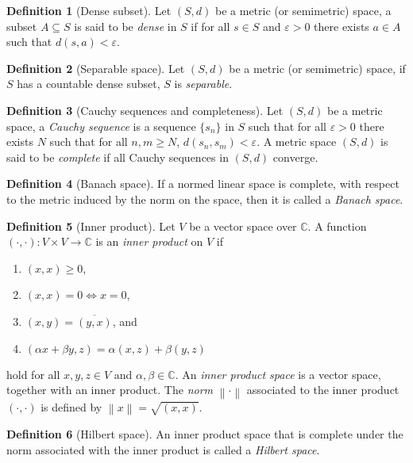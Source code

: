 \documentclass[12pt]{article}
\theoremstyle{definition}
\newtheorem{definition}{Definition}[section]
\newcommand{\eps}{\varepsilon}    %
\newcommand{\C}{\mathbb{C}}    %
\newcommand\norm[1]{\left\lVert#1\right\rVert}
\begin{document}
\begin{definition}[Dense subset]
    Let $(S,d)$ be a metric (or semimetric) space, a subset $A\subseteq S$ is said to be \textit{dense} in $S$ if for all $s\in S$ and $\eps > 0$ there exists $a\in A$ such that $d(s,a)<\eps$.
\end{definition}
\begin{definition}[Separable space]
    Let $(S,d)$ be a metric (or semimetric) space, if $S$ has a countable dense subset, $S$ is \textit{separable}.
\end{definition}
\begin{definition}[Cauchy sequences and completeness]
    Let $(S,d)$ be a metric space, a \textit{Cauchy sequence} is a sequence $\{s_n\}$ in $S$ such that for all $\eps>0$ there exists $N$ such that for all $n,m\geq N$, $d(s_n,s_m)<\eps$. A metric space $(S,d)$ is said to be \textit{complete} if all Cauchy sequences in $(S,d)$ converge.
\end{definition}
\begin{definition}[Banach space]
    If a normed linear space is complete, with respect to the metric induced by the norm on the space, then it is called a \textit{Banach space}.
\end{definition}
\begin{definition}[Inner product]
    Let $V$ be a vector space over $\C$. A function $(\cdot,\cdot):V\times V \to \C$ is an \textit{inner product} on $V$ if 
    \begin{enumerate}[label=(\alph*)]
        \item $(x,x)\geq0$,
        \item $(x,x)=0 \Longleftrightarrow x=0$,
        \item $(x,y)=\overline{(y,x)}$, and
        \item $(\alpha x+\beta y,z)=\alpha (x,z)+\beta (y,z)$
    \end{enumerate}
    hold for all $x,y,z\in V$ and $\alpha,\beta\in\C$. An \textit{inner product space} is a vector space, together with an inner product. The \textit{norm} $\norm{\cdot}$ associated to the inner product $(\cdot,\cdot)$ is defined by $\norm{x}=\sqrt{(x,x)}$. 
\end{definition}
\begin{definition}[Hilbert space]
    An inner product space that is complete under the norm associated with the inner product is called a \textit{Hilbert space}.
\end{definition}
\end{document}
